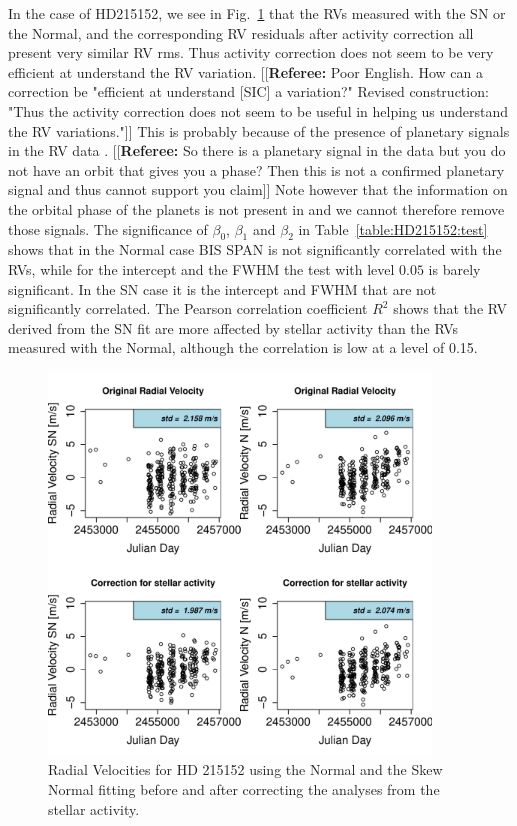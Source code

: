 \documentclass[11pt, oneside]{article}
\newcommand{\comment}[1]{{\color{red}[[\textbf{Referee: }#1]]}}
\begin{document}
In the case of HD215152, we see in Fig.~\ref{fig:HD215152:correctionRV} that the RVs measured with the SN or the Normal, and the corresponding RV residuals after activity correction all present very similar RV rms. Thus activity correction does not seem to be very efficient at understand the RV variation. 
\comment{Poor English. How can a correction be "efficient at understand [SIC] a variation?"
Revised construction: "Thus the activity correction does not seem to be useful in helping us understand the RV variations."}
This is probably because of the presence of planetary signals in the RV data \citep[][]{Mayor-2011}. 
\comment{So there is a planetary signal in the data but you do not have an orbit that gives you a phase? Then this is not a confirmed planetary signal and thus cannot support you claim}
Note however that the information on the orbital phase of the planets is not present in \citet{Mayor-2011} and we cannot therefore remove those signals. The significance of $\beta_{0}$, $\beta_{1}$ and $\beta_{2}$ in Table~\ref{table:HD215152:test} shows that in the Normal case BIS SPAN is not significantly correlated with the RVs, while for the intercept and the FWHM the test with level $0.05$ is barely significant. In the SN case it is the intercept and FWHM that are not significantly correlated. The Pearson correlation coefficient $R^2$ shows that the RV derived from the SN fit are more affected by stellar activity than the RVs measured with the Normal, although the correlation is low at a level of 0.15.
%
\begin{figure}[htbp]
   \centering
\includegraphics[height = 4in]{HD21515_[3]CorrectionActivity_RadialVelocity_vs_time.pdf} 
   \caption{Radial Velocities for HD 215152 using the Normal and the Skew Normal fitting before and after correcting the analyses from the stellar activity.}
   \label{fig:HD215152:correctionRV}
\end{figure}
\end{document}
